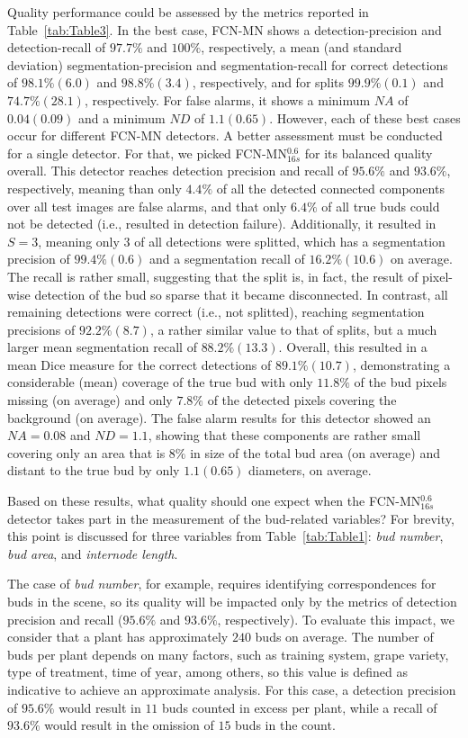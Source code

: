 \documentclass[a4paper,authoryear,review]{elsarticle}
\begin{document}
Quality performance could be assessed by the metrics reported in Table~\ref{tab:Table3}. In the best case, FCN-MN shows a  detection-precision and detection-recall of $97.7\%$ and $100\%$, respectively, a mean (and standard deviation) segmentation-precision and segmentation-recall for correct detections of $98.1\%(6.0)$ and $98.8\%(3.4)$, respectively, and for splits $99.9\%(0.1)$ and $74.7\%(28.1)$, respectively. For false alarms, it shows a minimum  $NA$ of $0.04(0.09)$ and a minimum $ND$ of $1.1(0.65)$.  
%
However, each of these best cases occur for different FCN-MN detectors. A better assessment must be conducted for a single detector. For that, we picked FCN-MN$_{16s}^{0.6}$ for its balanced quality overall. This detector reaches detection precision and recall of $95.6\%$ and $93.6\%$, respectively, meaning than only $4.4\%$ of all the detected connected components over all test images are false alarms, and that only $6.4\%$ of all true buds could not be detected (i.e., resulted in detection failure).
%
Additionally, it resulted in $S=3$, meaning only $3$ of all detections were splitted, which has a segmentation precision of $99.4\%(0.6)$ and a segmentation recall of $16.2\%(10.6)$ on average. The recall is rather small, suggesting that the split is, in fact, the result of pixel-wise detection of the bud so sparse that it became disconnected. In contrast, all remaining detections were correct (i.e., not splitted), reaching segmentation precisions of $92.2\%(8.7)$, a rather similar value to that of splits, but a much larger mean segmentation recall of $88.2\%(13.3)$. Overall, this resulted in a mean Dice measure for the correct detections of $89.1\%(10.7)$, demonstrating a considerable (mean) coverage of the true bud with only $11.8\%$ of the bud pixels missing (on average) and only $7.8\%$ of the detected pixels covering the background (on average).
%
The false alarm results for this detector showed an  $NA=0.08$ and $ND=1.1$, showing that these components are rather small covering only an area that is $8\%$ in size of the total bud area (on average) and distant to the true bud by only $1.1 (0.65)$ diameters, on average.

Based on these results, what quality should one expect when the FCN-MN$_{16s}^{0.6}$ detector takes part in the measurement of the bud-related variables? For brevity, this point is discussed for three variables from Table~\ref{tab:Table1}: \emph{bud number}, \emph{bud area}, and \emph{internode length}.

The case of \emph{bud number}, for example, requires identifying correspondences for buds in the scene, so its quality will be impacted only by the metrics of detection precision and recall ($95.6\%$ and $93.6\%$, respectively). To evaluate this impact, we consider that a plant has approximately $240$ buds on average. The number of buds per plant depends on many factors, such as training system, grape variety, type of treatment, time of year, among others, so this value is defined as indicative to achieve an approximate analysis. For this case, a detection precision of $95.6\%$ would result in $11$ buds counted in excess per plant, while a recall of $93.6\%$ would result in the omission of $15$ buds in the count. 
\end{document}
